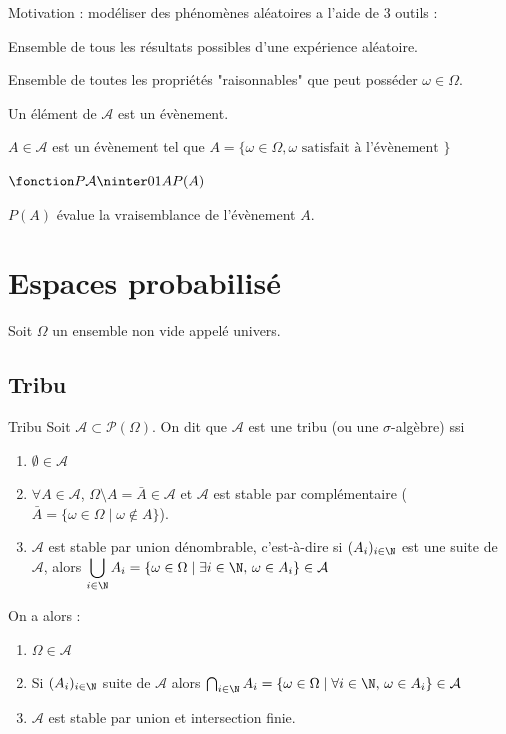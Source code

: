 Motivation : modéliser des phénomènes aléatoires a l'aide de 3 outils : 


Ensemble de tous les résultats possibles d'une expérience aléatoire.


Ensemble de toutes les propriétés "raisonnables" que peut posséder 
$\omega \in \Omega$. 

Un élément de $\mathcal A$ est un évènement. 

$A \in \mathcal A$ est un évènement tel que $A = \{ \omega \in \Omega, \omega \text{ satisfait à l'évènement } \}$



$\fonction P {\mathcal A}{\ninter 0 1} A {P(A)}$

$P(A)$ évalue la vraisemblance de l'évènement $A$. 

\section{Espaces probabilisé}

Soit $\Omega$ un ensemble non vide appelé univers. 

\subsection{Tribu }

\begin{definition}{Tribu}{}
    Soit $\mathcal A \subset \mathscr P(\Omega)$. On dit que $\mathcal A$ est une tribu (ou une $\sigma$-algèbre)
    ssi 
    \begin{enumerate}
        \item $\emptyset \in \mathcal A$
        \item $\forall A \in \mathcal A$, $\Omega \setminus A = \bar A \in \mathcal A$ et $\mathcal A$ est stable 
        par complémentaire ($\bar A = \{ \omega \in \Omega \mid \omega \notin A \}$).
        \item $\mathcal A$ est stable par union dénombrable, c'est-à-dire si $(A_i)_{i \in \N}$ est une suite 
        de $\mathcal A$, alors $\displaystyle \bigcup_{i \in \N} A_i = \{\omega \in \Omega \mid \exists i \in \N, \, \omega \in A_i\} \in \mathcal A$ 
    \end{enumerate}
    On a alors : 
    \begin{enumerate}
        \item $\Omega \in \mathcal A$
        \item Si $(A_i)_{i \in \N} $ suite de $\mathcal A$ alors $\bigcap_{i \in \N} A_i = \{\omega \in \Omega \mid \forall i \in \N, \, \omega \in A_i\} \in \mathcal A$
        \item $\mathcal A$ est stable par union et intersection finie. 
    \end{enumerate}
\end{definition}

